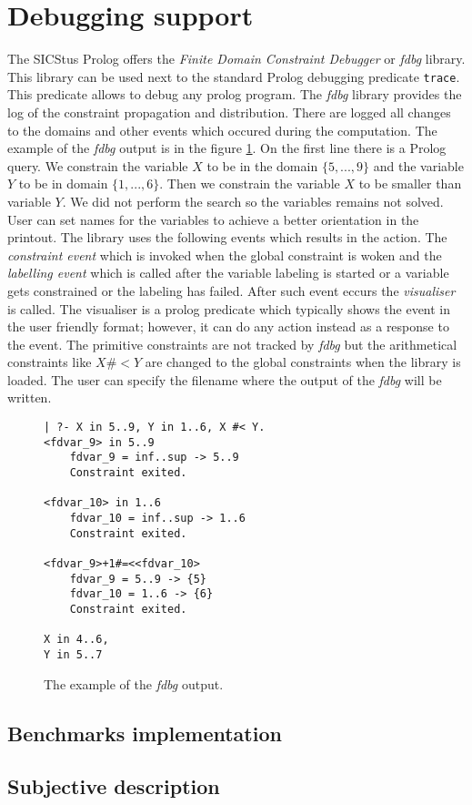 \section{Debugging support}
The SICStus Prolog offers the {\em Finite Domain Constraint Debugger} or {\em fdbg} library.
This library can be used next to the standard Prolog debugging predicate \texttt{trace}. This
predicate allows to debug any prolog program. The {\em fdbg} library provides the
log of the constraint propagation and distribution. There are logged all changes to the
domains and other events which occured during the computation. The example of the {\em fdbg}
output is in the figure \ref{sicstus:fdbg}. On the first line there is a Prolog query.
We constrain the variable $X$ to be in the domain $\{5,...,9\}$ and the variable $Y$
to be in domain $\{1,...,6\}$. Then we constrain the variable $X$ to be smaller than
variable $Y$. We did not perform the search so the variables remains not solved.
User can set names for the variables to achieve a better orientation in the printout.
The library uses the following events which results in the action. The {\em constraint 
event} which is invoked when the global constraint is woken and the {\em labelling event}
which is called after the variable labeling is started or a variable gets constrained
or the labeling has failed. After such event eccurs the {\em visualiser} is called. 
The visualiser is a prolog predicate which typically shows the event in the user 
friendly format; however, it can do any action instead as a response to the event.
The primitive constraints are not tracked by {\em fdbg} but the arithmetical constraints
like $X \#< Y$ are changed to the global constraints when the library is loaded.
The user can specify the filename where the output of the {\em fdbg} will be written.

\begin{figure}
\caption{\label{sicstus:fdbg}The example of the {\em fdbg} output.}
\begin{verbatim}
| ?- X in 5..9, Y in 1..6, X #< Y.
<fdvar_9> in 5..9
    fdvar_9 = inf..sup -> 5..9
    Constraint exited.

<fdvar_10> in 1..6
    fdvar_10 = inf..sup -> 1..6
    Constraint exited.

<fdvar_9>+1#=<<fdvar_10>
    fdvar_9 = 5..9 -> {5}
    fdvar_10 = 1..6 -> {6}
    Constraint exited.
    
X in 4..6,
Y in 5..7 
\end{verbatim}   
\end{figure}

\subsection{Benchmarks implementation}

\subsection{Subjective description}